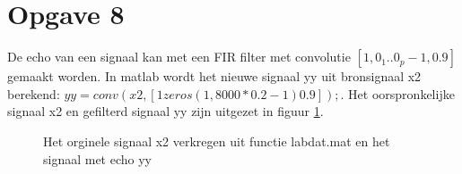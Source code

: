 \documentclass{article}
\begin{document}
\section{Opgave 8}
De echo van een signaal kan met een FIR filter met convolutie $[1, 0_1 .. 0_p-1, 0.9]$ gemaakt worden. In matlab wordt het nieuwe signaal yy uit bronsignaal x2 berekend: $yy = conv(x2, [1 zeros(1,8000*0.2 - 1) 0.9]);$. Het oorspronkelijke signaal x2 en gefilterd signaal yy zijn uitgezet in figuur \ref{fig:opgave8}.
\begin{figure}[h]
  \centering
  \caption{Het orginele signaal x2 verkregen uit functie labdat.mat en het signaal met echo yy}
  \label{fig:opgave8}
\end{figure}
\end{document}
